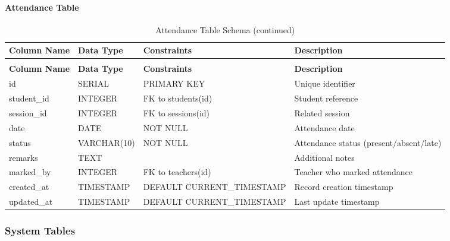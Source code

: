 \documentclass[12pt,a4paper]{report}
\begin{document}
\paragraph{Attendance Table}
\begin{longtable}{|p{3cm}|p{3cm}|p{2cm}|p{6cm}|}
\caption{Attendance Table Schema}
\label{tab:attendance}\\
\hline
\textbf{Column Name} & \textbf{Data Type} & \textbf{Constraints} & \textbf{Description} \\
\hline
\endfirsthead
\caption[]{Attendance Table Schema (continued)}\\
\hline
\textbf{Column Name} & \textbf{Data Type} & \textbf{Constraints} & \textbf{Description} \\
\hline
\endhead
id & SERIAL & PRIMARY KEY & Unique identifier \\
\hline
student\_id & INTEGER & FK to students(id) & Student reference \\
\hline
session\_id & INTEGER & FK to sessions(id) & Related session \\
\hline
date & DATE & NOT NULL & Attendance date \\
\hline
status & VARCHAR(10) & NOT NULL & Attendance status (present/absent/late) \\
\hline
remarks & TEXT & & Additional notes \\
\hline
marked\_by & INTEGER & FK to teachers(id) & Teacher who marked attendance \\
\hline
created\_at & TIMESTAMP & DEFAULT CURRENT\_TIMESTAMP & Record creation timestamp \\
\hline
updated\_at & TIMESTAMP & DEFAULT CURRENT\_TIMESTAMP & Last update timestamp \\
\hline
\end{longtable}

\subsubsection{System Tables}
\end{document}
